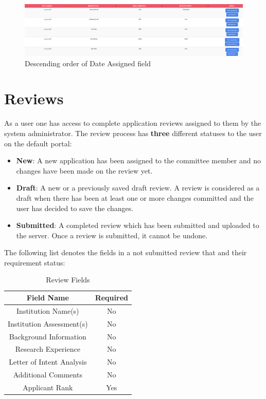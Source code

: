 \documentclass[fontsize=12pt,paper=letter,twoside]{scrartcl}
\begin{document}
\begin{figure}[!htb]
\begin{center}
\includegraphics[width=.9\textwidth]{images/order_descending.png}
\end{center}
\caption{Descending order of Date Assigned field}
\label{fig:order_descending}
\end{figure}

\newpage
\section{Reviews} \label{sec:reviews}
As a user one has access to complete application reviews assigned to them by the system administrator. The review process has \textbf{three} different statuses to the user on the default portal:
\begin{itemize}
\item \textbf{New}: A new application has been assigned to the committee member and no changes have been made on the review yet.
\item \textbf{Draft}: A new or a previously saved draft review. A review is considered as a draft when there has been at least one or more changes committed and the user has decided to save the changes.
\item \textbf{Submitted}: A completed review which has been submitted and uploaded to the server. Once a review is submitted, it cannot be undone.
\end{itemize}

\bigskip
\noindent The following list denotes the fields in a not submitted review that and their requirement status:
\begin{table}[h]
\centering
\begin{tabular}{|c | c |}
	\cline{1-2}
	\textbf{Field Name} & \textbf{Required}\\ \hline
	Institution Name(s) & No \\ \hline
	Institution Assessment(s) & No \\ \hline
	Background Information & No \\ \hline
	Research Experience & No \\ \hline
	Letter of Intent Analysis & No \\ \hline
	Additional Comments & No \\ \hline
	Applicant Rank & Yes \\ \hline
\end{tabular}
\caption {Review Fields}
\label{tbl:review_fields}
\end{table}
\end{document}
